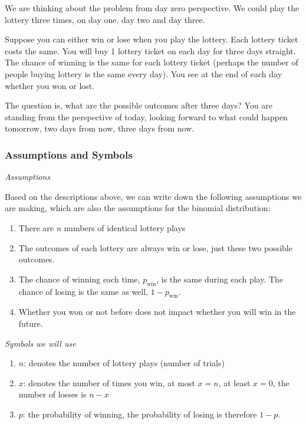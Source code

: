 \documentclass[
]{book}
\providecommand{\tightlist}{%
  \setlength{\itemsep}{0pt}\setlength{\parskip}{0pt}}
\begin{document}
We are thinking about the problem from day zero perspective. We could play the lottery three times, on day one, day two and day three.

Suppose you can either win or lose when you play the lottery. Each lottery ticket costs the same. You will buy 1 lottery ticket on each day for three days straight. The chance of winning is the same for each lottery ticket (perhaps the number of people buying lottery is the same every day). You see at the end of each day whether you won or lost.

The question is, what are the possible outcomes after three days? You are standing from the perspective of today, looking forward to what could happen tomorrow, two days from now, three days from now.

\hypertarget{assumptions-and-symbols}{%
\subsubsection{Assumptions and Symbols}\label{assumptions-and-symbols}}

\emph{Assumptions}

Based on the descriptions above, we can write down the following assumptions we are making, which are also the assumptions for the binomial distribution:

\begin{enumerate}
\def\labelenumi{\arabic{enumi}.}
\tightlist
\item
  There are \(n\) numbers of identical lottery plays
\item
  The outcomes of each lottery are always win or lose, just these two possible outcomes.
\item
  The chance of winning each time, \(p_{\text{win}}\), is the same during each play. The chance of losing is the same as well, \(1-p_{\text{win}}\).
\item
  Whether you won or not before does not impact whether you will win in the future.
\end{enumerate}

\emph{Symbols we will use}

\begin{enumerate}
\def\labelenumi{\arabic{enumi}.}
\tightlist
\item
  \(n\): denotes the number of lottery plays (number of trials)
\item
  \(x\): denotes the number of times you win, at most \(x=n\), at least \(x=0\), the number of losses is \(n-x\)
\item
  \(p\): the probability of winning, the probability of losing is therefore \(1-p\).
\end{enumerate}
\end{document}

